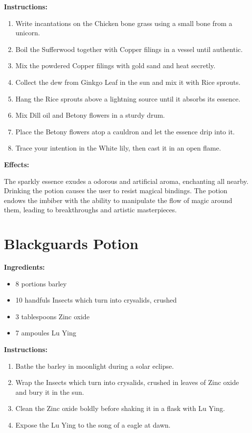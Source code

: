 \documentclass{article}
\begin{document}
\textbf{Instructions:}

\begin{enumerate}
  \item Write incantations on the Chicken bone grass using a small bone from a unicorn.
  \item Boil the Sufferwood together with Copper filings in a vessel until authentic.
  \item Mix the powdered Copper filings with gold sand and heat secretly.
  \item Collect the dew from Ginkgo Leaf in the sun and mix it with Rice sprouts.
  \item Hang the Rice sprouts above a lightning source until it absorbs its essence.
  \item Mix Dill oil and Betony flowers in a sturdy drum.
  \item Place the Betony flowers atop a cauldron and let the essence drip into it.
  \item Trace your intention in the White lily, then cast it in an open flame.
\end{enumerate}

\textbf{Effects:}

The sparkly essence exudes a odorous and artificial aroma, enchanting all nearby. Drinking the potion causes the user to resist magical bindings. The potion endows the imbiber with the ability to manipulate the flow of magic around them, leading to breakthroughs and artistic masterpieces.

\newpage
\section*{Blackguards Potion}

\textbf{Ingredients:}

\begin{itemize}
  \item 8 portions barley
  \item 10 handfuls Insects which turn into crysalids, crushed
  \item 3 tablespoons Zinc oxide
  \item 7 ampoules Lu Ying
\end{itemize}

\textbf{Instructions:}

\begin{enumerate}
  \item Bathe the barley in moonlight during a solar eclipse.
  \item Wrap the Insects which turn into crysalids, crushed in leaves of Zinc oxide and bury it in the sun.
  \item Clean the Zinc oxide boldly before shaking it in a flask with Lu Ying.
  \item Expose the Lu Ying to the song of a eagle at dawn.
\end{enumerate}
\end{document}
